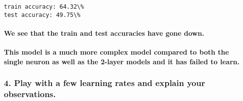 \documentclass[11pt]{article}
\begin{document}
    \begin{Verbatim}[commandchars=\\\{\}]
train accuracy: 64.32\%
test accuracy: 49.75\%

    \end{Verbatim}

    \paragraph{We see that the train and test accuracies have gone
down.}\label{we-see-that-the-train-and-test-accuracies-have-gone-down.}

\paragraph{This model is a much more complex model compared to both the
single neuron as well as the 2-layer models and it has failed to
learn.}\label{this-model-is-a-much-more-complex-model-compared-to-both-the-single-neuron-as-well-as-the-2-layer-models-and-it-has-failed-to-learn.}

    \subsubsection{4. Play with a few learning rates and explain your
observations.}\label{play-with-a-few-learning-rates-and-explain-your-observations.}
\end{document}
